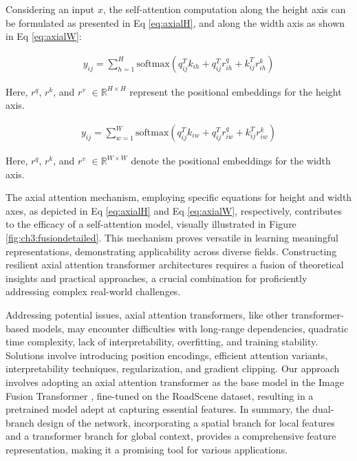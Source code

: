 Considering an input $x$, the self-attention computation along the height axis can be formulated as presented in Eq \ref{eq:axialH}, and along the width axis as shown in Eq \ref{eq:axialW}:

\begin{equation} \label{eq:axialH}
    \begin{split}
        y_{ij} = \sum_{h=1}^{H} \text{softmax}\left(q_{ij}^{T}k_{ih} + q_{ij}^{T} r_{ih}^q + k_{ij}^{T} r_{ih}^k\right)
    \end{split}
\end{equation}

Here, $r^q$, $r^k$, and $r^v$ $\in \mathbb{R}^{H \times H}$ represent the positional embeddings for the height axis. 

\begin{equation} \label{eq:axialW}
    \begin{split}
        y_{ij} = \sum_{w=1}^{W} \text{softmax}\left(q_{ij}^{T} k_{iw} + q_{ij}^{T} r_{iw}^q + k_{ij}^{T} r_{iw}^k\right)
    \end{split}
\end{equation}

Here, $r^q$, $r^k$, and $r^v$ $\in \mathbb{R}^{W \times W}$ denote the positional embeddings for the width axis.

The axial attention mechanism, employing specific equations for height and width axes, as depicted in Eq \ref{eq:axialH} and Eq \ref{eq:axialW}, respectively, contributes to the efficacy of a self-attention model, visually illustrated in Figure \ref{fig:ch3:fusiondetailed}. This mechanism proves versatile in learning meaningful representations, demonstrating applicability across diverse fields. Constructing resilient axial attention transformer architectures requires a fusion of theoretical insights and practical approaches, a crucial combination for proficiently addressing complex real-world challenges.

Addressing potential issues, axial attention transformers, like other transformer-based models, may encounter difficulties with long-range dependencies, quadratic time complexity, lack of interpretability, overfitting, and training stability. Solutions involve introducing position encodings, efficient attention variants, interpretability techniques, regularization, and gradient clipping. Our approach involves adopting an axial attention transformer as the base model in the Image Fusion Transformer \cite{vs2022image}, fine-tuned on the RoadScene \cite{xu2020aaai} dataset, resulting in a pretrained model adept at capturing essential features. In summary, the dual-branch design of the network, incorporating a spatial branch for local features and a transformer branch for global context, provides a comprehensive feature representation, making it a promising tool for various applications.


